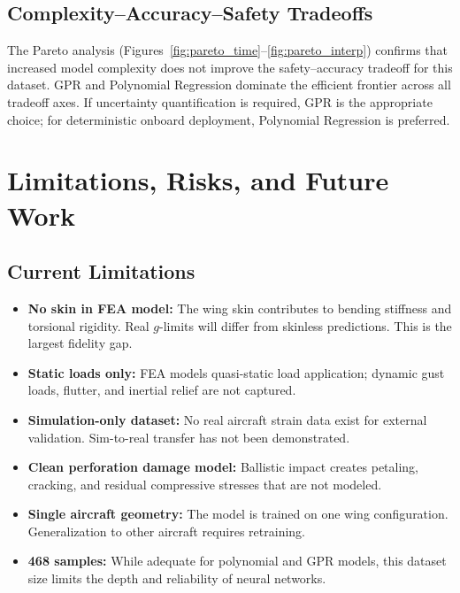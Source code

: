 \documentclass[10pt,letterpaper]{article}
\begin{document}
\subsection{Complexity--Accuracy--Safety Tradeoffs}

The Pareto analysis (Figures~\ref{fig:pareto_time}--\ref{fig:pareto_interp}) confirms that
increased model complexity does not improve the safety--accuracy tradeoff for this dataset.
GPR and Polynomial Regression dominate the efficient frontier across all tradeoff axes.
If uncertainty quantification is required, GPR is the appropriate choice; for deterministic
onboard deployment, Polynomial Regression is preferred.

\section{Limitations, Risks, and Future Work}

\subsection{Current Limitations}

\begin{itemize}
  \item \textbf{No skin in FEA model:} The wing skin contributes to bending stiffness and
    torsional rigidity. Real $g$-limits will differ from skinless predictions. This is the
    largest fidelity gap.
  \item \textbf{Static loads only:} FEA models quasi-static load application; dynamic gust
    loads, flutter, and inertial relief are not captured.
  \item \textbf{Simulation-only dataset:} No real aircraft strain data exist for external
    validation. Sim-to-real transfer has not been demonstrated.
  \item \textbf{Clean perforation damage model:} Ballistic impact creates petaling,
    cracking, and residual compressive stresses that are not modeled.
  \item \textbf{Single aircraft geometry:} The model is trained on one wing configuration.
    Generalization to other aircraft requires retraining.
  \item \textbf{468 samples:} While adequate for polynomial and GPR models, this dataset
    size limits the depth and reliability of neural networks.
\end{itemize}
\end{document}
